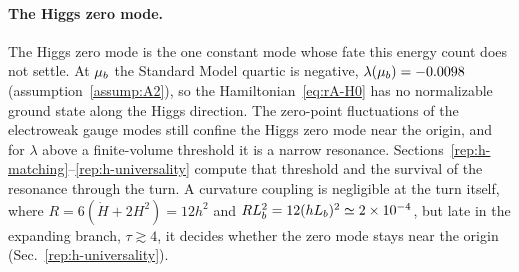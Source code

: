 \paragraph{The Higgs zero mode.}
The Higgs zero mode is the one constant mode whose fate this energy count does not settle.
At $\mu_b$ the Standard Model quartic is negative, $\lambda(\mu_b)=-0.0098$ (assumption~\ref{assump:A2}), so the Hamiltonian~\eqref{eq:rA-H0} has no normalizable ground state along the Higgs direction. %
The zero-point fluctuations of the electroweak gauge modes still confine the Higgs zero mode near the origin, and for $\lambda$ above a finite-volume threshold it is a narrow resonance.
Sections~\ref{rep:h-matching}--\ref{rep:h-universality} compute that threshold and the survival of the resonance through the turn.
A curvature coupling is negligible at the turn itself, where $R=6(\dot H+2H^2)=12h^2$ and $RL_b^2=12(hL_b)^2\simeq2\times10^{-4}$, but late in the expanding branch, $\tau\gtrsim4$, it decides whether the zero mode stays near the origin (Sec.~\ref{rep:h-universality}). %
